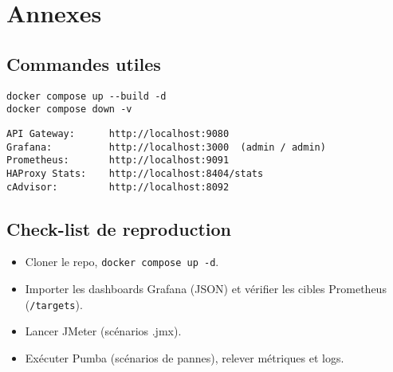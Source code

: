 \appendix
\chapter{Annexes}

\section{Commandes utiles}
\begin{lstlisting}[caption={Démarrage / arrêt stack}]
docker compose up --build -d
docker compose down -v
\end{lstlisting}

\begin{lstlisting}[caption={Accès interfaces}]
API Gateway:      http://localhost:9080
Grafana:          http://localhost:3000  (admin / admin)
Prometheus:       http://localhost:9091
HAProxy Stats:    http://localhost:8404/stats
cAdvisor:         http://localhost:8092
\end{lstlisting}

\section{Check-list de reproduction}
\begin{itemize}
  \item Cloner le repo, \texttt{docker compose up -d}.
  \item Importer les dashboards Grafana (JSON) et vérifier les cibles Prometheus (\texttt{/targets}).
  \item Lancer JMeter (scénarios .jmx).
  \item Exécuter Pumba (scénarios de pannes), relever métriques et logs.
\end{itemize}